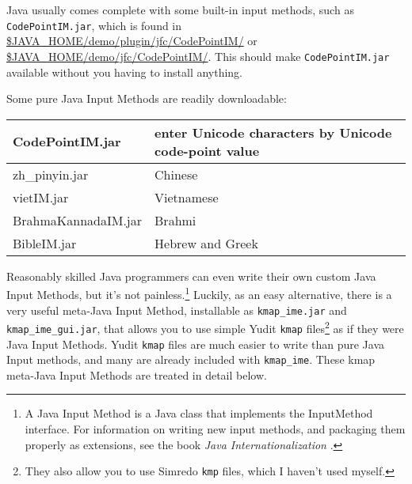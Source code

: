 Java usually comes complete with some built-in input methods, such as
\texttt{CodePointIM.jar}, which is found in
\url{\$JAVA_HOME/demo/plugin/jfc/CodePointIM/} or
\url{\$JAVA_HOME/demo/jfc/CodePointIM/}.  This should make \texttt{CodePointIM.jar}
available without you having to install anything. 

Some pure Java Input Methods are readily downloadable:

\vspace{.5cm}

\renewcommand\tabcolsep{1.25mm}

\noindent
\begin{tabular}{|l|l|}
\hline
CodePointIM.jar     & enter Unicode characters by Unicode code-point value\footnotemark \\
\hline
zh\_pinyin.jar      & Chinese\footnotemark \\
\hline
vietIM.jar          & Vietnamese\footnotemark \\
\hline
BrahmaKannadaIM.jar & Brahmi\footnotemark \\
\hline
BibleIM.jar         & Hebrew and Greek\footnotemark \\
\hline
\end{tabular}

\vspace{.5cm}

\addtocounter{footnote}{-4}






Reasonably skilled Java programmers can even write their own custom Java
Input Methods, but it's not painless.\footnote{A Java Input Method is a
Java class that implements the InputMethod interface.  For information on
writing new input methods, and packaging them properly as extensions, see
the book \emph{Java Internationalization}
\citep{deitsch+czarnecki:2001}.} Luckily, as an easy alternative, there is a very useful
meta-Java Input Method, installable as \texttt{kmap\_ime.jar} and
\texttt{kmap\_ime\_gui.jar}, that allows you to use simple Yudit
\texttt{kmap} files\footnote{They also allow you to use Simredo
\texttt{kmp} files, which I haven't used myself.} as if they were Java
Input Methods.  Yudit \texttt{kmap} files are much easier to write than
pure Java Input methods, and many are already included with
\texttt{kmap\_ime}.  These kmap meta-Java Input Methods are treated in
detail below.


